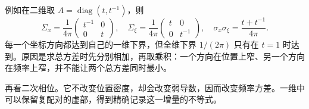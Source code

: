 例如在二维取 \(A=\operatorname{diag}(t,t^{-1})\)，则
\[
 \Sigma_x=\frac1{4\pi}
 \begin{pmatrix}t^{-1}&0\\0&t\end{pmatrix},
 \quad
 \Sigma_\xi=\frac1{4\pi}
 \begin{pmatrix}t&0\\0&t^{-1}\end{pmatrix},
 \quad
 \sigma_x\sigma_\xi=\frac{t+t^{-1}}{4\pi}.
\]
每一个坐标方向都达到自己的一维下界，但全维下界 \(1/(2\pi)\) 只有在 \(t=1\) 时达到。原因是求总方差时先分别相加，再取乘积：一个方向在位置上窄、另一个方向在频率上窄，并不能让两个总方差同时最小。

再看二次相位。它不改变位置密度，却会改变弱导数，因而改变频率方差。一维中可以保留复配对的虚部，得到精确记录这一增量的不等式。

